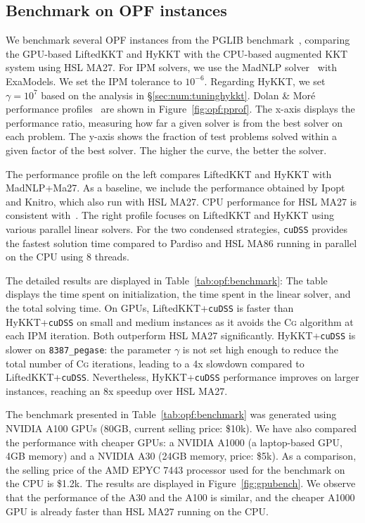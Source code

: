 \documentclass[smallextended]{svjour3}
\newcommand{\CG}{\textsc{Cg}\xspace}
\newcommand{\add}[1]{#1}
\begin{document}
\subsection{Benchmark on OPF instances}
\label{sec:num:opf}

We benchmark several OPF instances from the PGLIB benchmark~\cite{babaeinejadsarookolaee2019power},
comparing the GPU-based LiftedKKT and HyKKT with the CPU-based augmented KKT system using HSL MA27.
For IPM solvers, we use the MadNLP solver~\cite{shin2021graph} with ExaModels.
We set the IPM tolerance to $10^{-6}$.
Regarding HyKKT, we set $\gamma = 10^7$ based on the analysis in \S\ref{sec:num:tuninghykkt}.
Dolan \& Moré performance profiles~\cite{dolan2002benchmarking} are shown in Figure~\ref{fig:opf:pprof}.
\add{The x-axis displays the performance ratio, measuring how far a given solver is from
  the best solver on each problem.
  The y-axis shows the fraction of test problems solved within a given factor of the best solver.
  The higher the curve, the better the solver.
}
The performance profile on the left compares LiftedKKT and HyKKT with
MadNLP+Ma27. As a baseline, we include the performance obtained by Ipopt and
Knitro, which also run with HSL MA27. CPU performance for HSL MA27
is consistent with~\cite{babaeinejadsarookolaee2019power}.
The right profile focuses on LiftedKKT and HyKKT using
various parallel linear solvers.
For the two condensed strategies, {\tt cuDSS} provides the fastest solution time compared to
Pardiso and HSL MA86 running in parallel on the CPU using 8 threads.

The detailed results are displayed in Table~\ref{tab:opf:benchmark}:
The table displays the time spent on initialization, the time spent in the
linear solver, and the total solving time. On GPUs, LiftedKKT+{\tt cuDSS} is
faster than HyKKT+{\tt cuDSS} on small and medium instances as it avoids the \CG algorithm
at each IPM iteration.
Both outperform HSL MA27 significantly. HyKKT+{\tt cuDSS} is slower
on {\tt 8387\_pegase}: the
parameter $\gamma$ is not set high enough to reduce the total number of \CG
iterations, leading to a 4x slowdown compared to LiftedKKT+{\tt cuDSS}.
Nevertheless, HyKKT+{\tt cuDSS} performance improves on larger
instances, reaching an 8x speedup over HSL MA27.

The benchmark presented in Table~\ref{tab:opf:benchmark} was generated using NVIDIA A100 GPUs (80GB, current selling price: \$10k).
We have also compared the performance
with cheaper GPUs: a NVIDIA A1000 (a laptop-based GPU, 4GB memory) and a NVIDIA A30
(24GB memory, price: \$5k).
As a comparison, the selling price of the AMD EPYC
7443 processor used for the benchmark on the CPU is \$1.2k. The results are
displayed in Figure~\ref{fig:gpubench}. We observe that the performance of the A30
and the A100 is similar, and the cheaper A1000 GPU is already
faster than HSL MA27 running on the CPU.
\end{document}
